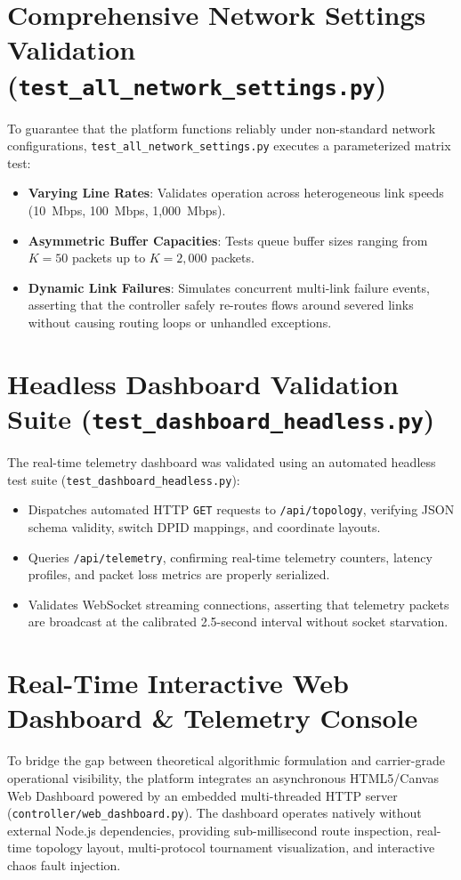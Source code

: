 \documentclass[12pt,a4paper,oneside]{report}
\begin{document}
\section{Comprehensive Network Settings Validation (\texttt{test\_all\_network\_settings.py})}
To guarantee that the platform functions reliably under non-standard network configurations, \texttt{test\_all\_network\_settings.py} executes a parameterized matrix test:
\begin{itemize}
    \item \textbf{Varying Line Rates}: Validates operation across heterogeneous link speeds (10~Mbps, 100~Mbps, 1,000~Mbps).
    \item \textbf{Asymmetric Buffer Capacities}: Tests queue buffer sizes ranging from $K = 50$ packets up to $K = 2,000$ packets.
    \item \textbf{Dynamic Link Failures}: Simulates concurrent multi-link failure events, asserting that the controller safely re-routes flows around severed links without causing routing loops or unhandled exceptions.
\end{itemize}

\section{Headless Dashboard Validation Suite (\texttt{test\_dashboard\_headless.py})}
The real-time telemetry dashboard was validated using an automated headless test suite (\texttt{test\_dashboard\_headless.py}):
\begin{itemize}
    \item Dispatches automated HTTP \texttt{GET} requests to \texttt{/api/topology}, verifying JSON schema validity, switch DPID mappings, and coordinate layouts.
    \item Queries \texttt{/api/telemetry}, confirming real-time telemetry counters, latency profiles, and packet loss metrics are properly serialized.
    \item Validates WebSocket streaming connections, asserting that telemetry packets are broadcast at the calibrated 2.5-second interval without socket starvation.
\end{itemize}

\section{Real-Time Interactive Web Dashboard \& Telemetry Console}
\label{sec:web_dashboard_operations}
To bridge the gap between theoretical algorithmic formulation and carrier-grade operational visibility, the platform integrates an asynchronous HTML5/Canvas Web Dashboard powered by an embedded multi-threaded HTTP server (\texttt{controller/web\_dashboard.py}). The dashboard operates natively without external Node.js dependencies, providing sub-millisecond route inspection, real-time topology layout, multi-protocol tournament visualization, and interactive chaos fault injection.
\end{document}
